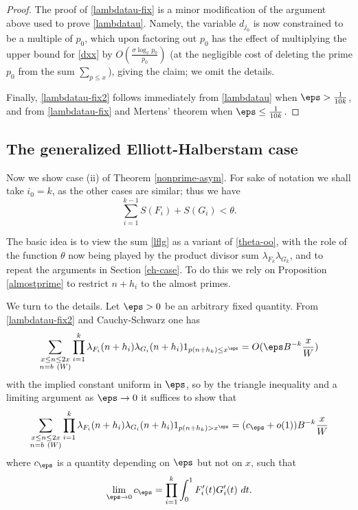 \begin{proof}
The proof of \eqref{lambdatau-fix} is a minor modification of the argument above used to prove \eqref{lambdatau}.  Namely, the variable $d_{j_0}$ is now constrained to be a multiple of $p_0$, which upon factoring out $p_0$ has the effect of multiplying the upper bound for \eqref{dxx} by $O( \frac{\sigma \log_x p_0}{p_0})$ (at the negligible cost of deleting the prime $p_0$ from the sum $\sum_{p \leq x}$), giving the claim; we omit the details.

Finally, \eqref{lambdatau-fix2} follows immediately from \eqref{lambdatau} when $\eps > \frac{1}{10k}$, and from \eqref{lambdatau-fix} and Mertens' theorem when $\eps \leq \frac{1}{10k}$.
\end{proof}


\subsection{The generalized Elliott-Halberstam case}\label{geh-case}

Now we show case (ii) of Theorem \ref{nonprime-asym}.  For sake of notation we shall take $i_0=k$, as the other cases are similar; thus we have
\begin{equation}\label{ik1}
\sum_{i=1}^{k-1} S(F_{i}) + S(G_{i}) < \theta.
\end{equation}

The basic idea is to view the sum \eqref{lflg} as a variant of \eqref{theta-oo}, with the role of the function $\theta$ now being played by the product divisor sum $\lambda_{F_k} \lambda_{G_k}$, and to repeat the arguments in Section \ref{eh-case}.  To do this we rely on Proposition \ref{almostprime} to restrict $n+h_i$ to the almost primes.

We turn to the details.  Let $\eps > 0$ be an arbitrary fixed quantity.  From \eqref{lambdatau-fix2} and Cauchy-Schwarz one has
$$
 \sum_{\substack{x \leq n \leq 2x\\ n = b\ (W)}} \prod_{i=1}^k \lambda_{F_{i}}(n+h_{i}) \lambda_{G_{i}}(n+h_{i}) 1_{p(n+h_k) \leq x^\eps} = O( \eps B^{-k} \frac{x}{W} )
$$
with the implied constant uniform in $\eps$,
so by the triangle inequality and a limiting argument as $\eps \to 0$ it suffices to show that
\begin{equation}\label{lltrunc}
 \sum_{\substack{x \leq n \leq 2x\\ n = b\ (W)}} \prod_{i=1}^k \lambda_{F_{i}}(n+h_{i}) \lambda_{G_{i}}(n+h_{i}) 1_{p(n+h_k) > x^\eps} = (c_\eps + o(1)) B^{-k} \frac{x}{W} 
\end{equation}
where $c_\eps$ is a quantity depending on $\eps$ but not on $x$, such that
$$ \lim_{\eps \to 0} c_\eps = \prod_{i=1}^k \int_0^1 F'_i(t) G'_i(t)\ dt.$$

